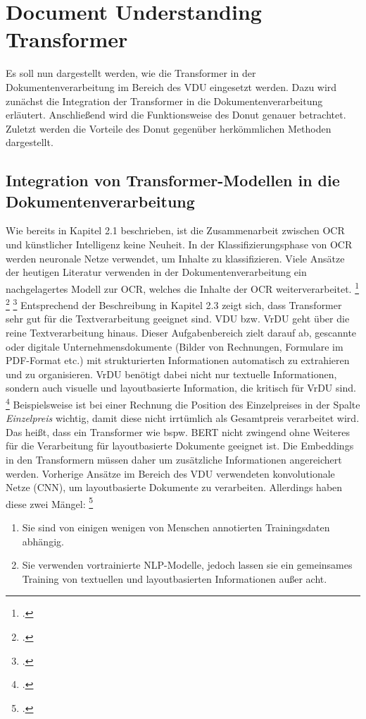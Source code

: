 \section{Document Understanding Transformer}
Es soll nun dargestellt werden, wie die Transformer in der Dokumentenverarbeitung im Bereich des \ac{VDU} eingesetzt werden. Dazu wird zunächst die Integration der Transformer in die Dokumentenverarbeitung erläutert. Anschließend wird die Funktionsweise des \ac{Donut} genauer betrachtet. Zuletzt werden die Vorteile des \ac{Donut} gegenüber herkömmlichen Methoden dargestellt.

\subsection{Integration von Transformer-Modellen in die Dokumentenverarbeitung}
Wie bereits in Kapitel 2.1 beschrieben, ist die Zusammenarbeit zwischen OCR und künstlicher Intelligenz keine Neuheit. In der Klassifizierungsphase von OCR werden neuronale Netze verwendet, um Inhalte zu klassifizieren. Viele Ansätze der heutigen Literatur verwenden in der Dokumentenverarbeitung ein nachgelagertes Modell zur OCR, welches die Inhalte der OCR weiterverarbeitet. \footcites[Vgl.][]{hwang_post-ocr_2019} \footcites[Vgl.][]{hwang_spatial_2021} \footcites[Vgl.][]{xu_layoutlm_2020} Entsprechend der Beschreibung in Kapitel 2.3 zeigt sich, dass Transformer sehr gut für die Textverarbeitung geeignet sind. \ac{VDU} bzw. \ac{VrDU} geht über die reine Textverarbeitung hinaus. Dieser Aufgabenbereich zielt darauf ab, gescannte oder digitale Unternehmensdokumente (Bilder von Rechnungen, Formulare im PDF-Format etc.) mit strukturierten Informationen automatisch zu extrahieren und zu organisieren. \ac{VrDU} benötigt dabei nicht nur textuelle Informationen, sondern auch visuelle und layoutbasierte Information, die kritisch für \ac{VrDU} sind. \footcites[Vgl.][S. 1192]{xu_layoutlmv2_2022} Beispielsweise ist bei einer Rechnung die Position des Einzelpreises in der Spalte \emph{Einzelpreis} wichtig, damit diese nicht irrtümlich als Gesamtpreis verarbeitet wird. Das heißt, dass ein Transformer wie bspw. BERT nicht zwingend ohne Weiteres für die Verarbeitung für layoutbasierte Dokumente geeignet ist. Die Embeddings in den Transformern müssen daher um zusätzliche Informationen angereichert werden. Vorherige Ansätze im Bereich des \ac{VDU} verwendeten konvolutionale Netze (\ac{CNN}), um layoutbasierte Dokumente zu verarbeiten. Allerdings haben diese zwei Mängel: \footcites[Vgl.][S. 1193]{xu_layoutlm_2020}
\begin{enumerate}[1.]
    \item Sie sind von einigen wenigen von Menschen annotierten Trainingsdaten abhängig.
    \item Sie verwenden vortrainierte NLP-Modelle, jedoch lassen sie ein gemeinsames Training von textuellen und layoutbasierten Informationen außer acht.
\end{enumerate}
